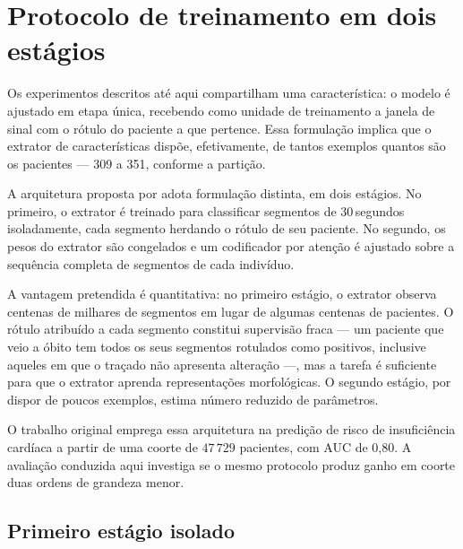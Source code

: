 
\section{Protocolo de treinamento em dois estágios}
\label{sec:resultados-deephhf}

Os experimentos descritos até aqui compartilham uma característica: o
modelo é ajustado em etapa única, recebendo como unidade de treinamento a
janela de sinal com o rótulo do paciente a que pertence. Essa formulação
implica que o extrator de características dispõe, efetivamente, de tantos
exemplos quantos são os pacientes --- 309 a 351, conforme a partição.

A arquitetura proposta por  adota formulação
distinta, em dois estágios. No primeiro, o extrator é treinado para
classificar segmentos de 30\,segundos isoladamente, cada segmento herdando o
rótulo de seu paciente. No segundo, os pesos do extrator são congelados e
um codificador por atenção é ajustado sobre a sequência completa de
segmentos de cada indivíduo.

A vantagem pretendida é quantitativa: no primeiro estágio, o extrator
observa centenas de milhares de segmentos em lugar de algumas centenas de
pacientes. O rótulo atribuído a cada segmento constitui supervisão fraca
--- um paciente que veio a óbito tem todos os seus segmentos rotulados como
positivos, inclusive aqueles em que o traçado não apresenta alteração ---,
mas a tarefa é suficiente para que o extrator aprenda representações
morfológicas. O segundo estágio, por dispor de poucos exemplos, estima
número reduzido de parâmetros.

O trabalho original emprega essa arquitetura na predição de risco de
insuficiência cardíaca a partir de uma coorte de $47\,729$ pacientes, com
\gls{AUC} de 0,80. A avaliação conduzida aqui investiga se o mesmo
protocolo produz ganho em coorte duas ordens de grandeza menor.

\subsection{Primeiro estágio isolado}
\label{subsec:deephhf-estagio1}

